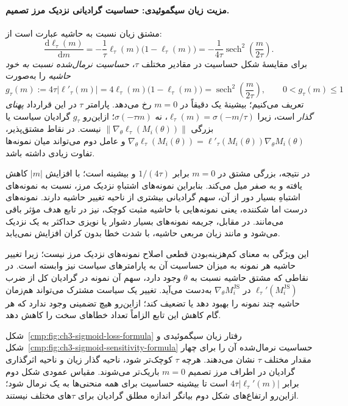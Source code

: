 \paragraph{مزیت زیان سیگموئیدی: حساسیت گرادیانی نزدیک مرز تصمیم.}
مشتق زیان نسبت به حاشیه عبارت است از:
\begin{equation}\label{cmp:eq:ch3-js-sigmoid-derivative}
\boxed{
\frac{\mathrm d\ell_\tau(m)}{\mathrm dm}
=-\frac{1}{\tau}\ell_\tau(m)
\bigl(1-\ell_\tau(m)\bigr)
=-\frac{1}{4\tau}
\operatorname{sech}^{2}\!\left(\frac{m}{2\tau}\right).
}
\end{equation}
برای مقایسهٔ شکل حساسیت در مقادیر مختلف
$\tau$، \emph{حساسیت نرمال‌شده نسبت به خود حاشیه} را
به‌صورت
\begin{equation}\label{cmp:eq:ch3-js-sigmoid-normalized-sensitivity}
\boxed{
g_\tau(m):=4\tau\left|\ell'_\tau(m)\right|
=4\ell_\tau(m)\bigl(1-\ell_\tau(m)\bigr)
=\operatorname{sech}^{2}\!\left(\frac{m}{2\tau}\right),
\qquad 0<g_\tau(m)\le1
}
\end{equation}
تعریف می‌کنیم؛ بیشینهٔ یک دقیقاً در $m=0$ رخ می‌دهد.
پارامتر $\tau$ در این قرارداد \emph{پهنای گذار}
است، زیرا $\ell_\tau(m)=\sigma(-m/\tau)$،
نه $\sigma(-\tau m)$؛ ازاین‌رو
$g_\tau$ گرادیان سیاست یا بزرگی
$\|\nabla_\theta\ell_\tau(M_i(\theta))\|$
نیست. در نقاط مشتق‌پذیر،
$\nabla_\theta\ell_\tau(M_i(\theta))
=\ell'_\tau(M_i(\theta))\nabla_\theta M_i(\theta)$
و عامل دوم می‌تواند میان نمونه‌ها تفاوت زیادی داشته باشد.

در نتیجه، بزرگی مشتق در $m=0$ برابر $1/(4\tau)$ و بیشینه است؛ با افزایش $|m|$ کاهش یافته و به صفر میل می‌کند. بنابراین نمونه‌های اشتباهِ نزدیک مرز، نسبت به نمونه‌های اشتباهِ بسیار دور از آن، سهم گرادیانی بیشتری از ناحیه تغییر حاشیه دارند. نمونه‌های درست اما شکننده، یعنی نمونه‌هایی با حاشیه مثبت کوچک، نیز در تابع هدف مؤثر باقی می‌مانند. در مقابل، جریمه نمونه‌های بسیار دشوار یا نویزی حداکثر به یک نزدیک می‌شود و مانند زیان مربعی حاشیه، با شدت خطا بدون کران افزایش نمی‌یابد.

این ویژگی به معنای کم‌هزینه‌بودن قطعی اصلاح نمونه‌های نزدیک مرز نیست؛ زیرا تغییر حاشیه هر نمونه به میزان حساسیت آن به پارامترهای سیاست نیز وابسته است. در نقاطی که مشتق حاشیه نسبت به $\theta$ وجود دارد، سهم آن نمونه در گرادیان کل از ضرب $\ell_\tau'(M_i^{\mathrm{JS}})$ در $\nabla_\theta M_i^{\mathrm{JS}}$ به‌دست می‌آید. تغییر یک سیاست مشترک می‌تواند هم‌زمان حاشیه چند نمونه را بهبود دهد یا تضعیف کند؛ ازاین‌رو هیچ تضمینی وجود ندارد که هر گام کاهش این تابع الزاماً تعداد خطاهای سخت را کاهش دهد.


شکل~\ref{cmp:fig:ch3-sigmoid-loss-formula} رفتار زیان سیگموئیدی و شکل~\ref{cmp:fig:ch3-sigmoid-sensitivity-formula} حساسیت نرمال‌شده آن را برای چهار مقدار مختلف $\tau$ نشان می‌دهند. هرچه $\tau$ کوچک‌تر شود، ناحیه گذار زیان و ناحیه اثرگذاری گرادیان در اطراف مرز تصمیم $m=0$ باریک‌تر می‌شوند. مقیاس عمودی شکل دوم برابر $4\tau|\ell_\tau'(m)|$ است تا بیشینه حساسیت برای همه منحنی‌ها به یک نرمال شود؛ ازاین‌رو ارتفاع‌های شکل دوم بیانگر اندازه مطلق گرادیان برای $\tau$های مختلف نیستند.

